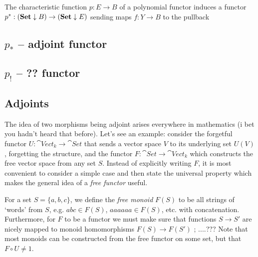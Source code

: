 The characteristic function $p:E\to B$ of a polynomial functor induces a functor $p^*:(\mathbf{Set}\downarrow B)\to(\mathbf{Set}\downarrow E)$ sending maps $f:Y\to B$ to the pullback

\begin{figure}[!ht]
\centering
{}
\end{figure}

\subsection{$p_*$ -- adjoint functor}

\subsection{$p_!$ -- ?? functor}

\subsection{Adjoints}
The idea of two morphisms being adjoint arises everywhere in mathematics (i bet you hadn't heard that before). Let's see an example: consider the forgetful functor $U:\cat{Vect_k}\to\cat{Set}$ that sends a vector space $V$ to its underlying set $U(V)$, forgetting the structure, and the functor $F:\cat{Set}\to\cat{Vect_k}$ which constructs the free vector space from any set $S$. Instead of explicitly writing $F$, it is most convenient to consider a simple case and then state the universal property which makes the general idea of a \emph{free functor} useful.

For a set $S=\{a,b,c\}$, we define the \emph{free monoid} $F(S)$ to be all strings of `words' from $S$, e.g. $abc\in F(S)$, $aaaaaa\in F(S)$, etc. with concatenation. Furthermore, for $F$ to be a functor we must make sure that functions $S\to S'$ are nicely mapped to monoid homomorphisms $F(S)\to F(S')$ ; ....??? Note that most monoids can be constructed from the free functor on some set, but that $F\circ U\neq 1$.
